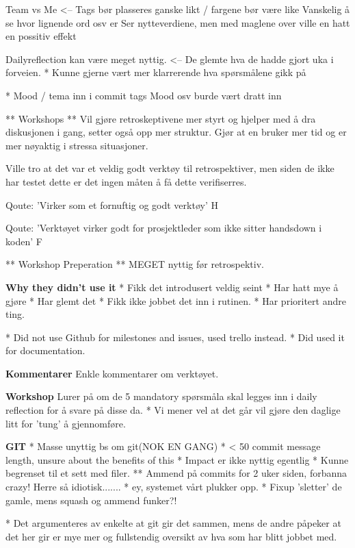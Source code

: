  Team vs Me <-- Tags bør plasseres ganske likt / fargene bør være like
				Vanskelig å se hvor lignende ord osv er
				Ser nytteverdiene, men med maglene over ville en hatt en possitiv effekt

Dailyreflection kan være meget nyttig. <-- De glemte hva de hadde gjort uka i forveien.
	* Kunne gjerne vært mer klarrerende hva spørsmålene gikk på


 * Mood / tema inn i commit tags
 Mood osv burde vært dratt inn

 ** Workshops **
 Vil gjøre retroskeptivene mer styrt og hjelper med å dra diskusjonen i gang, setter også opp mer struktur.
 Gjør at en bruker mer tid og er mer nøyaktig i stressa situasjoner.

 Ville tro at det var et veldig godt verktøy til retrospektiver, men siden de ikke har testet dette er det ingen måten å få dette verifiserres.
 
 Qoute: 'Virker som et fornuftig og godt verktøy' H

 Qoute: 'Verktøyet virker godt for prosjektleder som ikke sitter handsdown i koden' F

** Workshop Preperation **
 MEGET nyttig før retrospektiv.

\textbf{Why they didn't use it}
* Fikk det introdusert veldig seint
	* Har hatt mye å gjøre
	* Har glemt det
* Fikk ikke jobbet det inn i rutinen.
* Har prioritert andre ting.


* Did not use Github for milestones and issues, used trello instead.
	* Did used it for documentation.

\textbf{Kommentarer}
Enkle kommentarer om verktøyet.

\textbf{Workshop}
Lurer på om de 5 mandatory spørsmåla skal legges inn i daily reflection for å svare på disse da.
	* Vi mener vel at det går vil gjøre den daglige litt for 'tung' å gjennomføre.


\textbf{GIT}
* Masse unyttig bs om git(NOK EN GANG)
* < 50 commit message length, unsure about the benefits of this
* Impact er ikke nyttig egentlig
	* Kunne begrenset til et sett med filer.
	** Ammend på commits for 2 uker siden, forbanna crazy! Herre så idiotisk.......
		* ey, systemet vårt plukker opp.
* Fixup 'sletter' de gamle, mens squash og ammend funker?!

* Det argumenteres av enkelte at git gir det sammen, mens de andre påpeker at det her gir er mye mer og fullstendig oversikt av hva som har blitt jobbet med.



